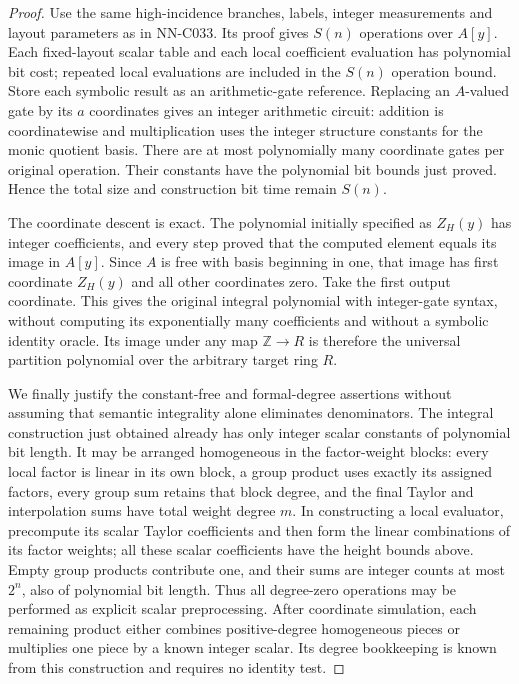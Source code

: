 \begin{proof}
Use the same high-incidence branches, labels, integer measurements and layout parameters as in NN-C033. Its proof gives $S(n)$ operations over $A[y]$. Each fixed-layout scalar table and each local coefficient evaluation has polynomial bit cost; repeated local evaluations are included in the $S(n)$ operation bound. Store each symbolic result as an arithmetic-gate reference. Replacing an $A$-valued gate by its $a$ coordinates gives an integer arithmetic circuit: addition is coordinatewise and multiplication uses the integer structure constants for the monic quotient basis. There are at most polynomially many coordinate gates per original operation. Their constants have the polynomial bit bounds just proved. Hence the total size and construction bit time remain $S(n)$.

The coordinate descent is exact. The polynomial initially specified as $Z_H(y)$ has integer coefficients, and every step proved that the computed element equals its image in $A[y]$. Since $A$ is free with basis beginning in one, that image has first coordinate $Z_H(y)$ and all other coordinates zero. Take the first output coordinate. This gives the original integral polynomial with integer-gate syntax, without computing its exponentially many coefficients and without a symbolic identity oracle. Its image under any map $\mathbb Z\to R$ is therefore the universal partition polynomial over the arbitrary target ring $R$.

We finally justify the constant-free and formal-degree assertions without assuming that semantic integrality alone eliminates denominators. The integral construction just obtained already has only integer scalar constants of polynomial bit length. It may be arranged homogeneous in the factor-weight blocks: every local factor is linear in its own block, a group product uses exactly its assigned factors, every group sum retains that block degree, and the final Taylor and interpolation sums have total weight degree $m$. In constructing a local evaluator, precompute its scalar Taylor coefficients and then form the linear combinations of its factor weights; all these scalar coefficients have the height bounds above. Empty group products contribute one, and their sums are integer counts at most $2^n$, also of polynomial bit length. Thus all degree-zero operations may be performed as explicit scalar preprocessing. After coordinate simulation, each remaining product either combines positive-degree homogeneous pieces or multiplies one piece by a known integer scalar. Its degree bookkeeping is known from this construction and requires no identity test.


\end{proof}
